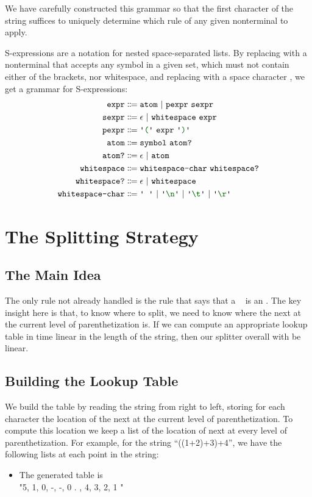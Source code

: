   We have carefully constructed this grammar so that the first character of the string suffices to uniquely determine which rule of any given nonterminal to apply.
  
  S-expressions are a notation for nested space-separated lists.  By replacing  with a nonterminal that accepts any symbol in a given set, which must not contain either of the brackets, nor whitespace, and replacing \terminal{+} with a space character \terminal{\ }, we get a grammar for S-expressions:
  \begin{align*}
    \nt{expr} & \Coloneqq \nt{atom}~|~\nt{pexpr}~\nt{sexpr} \\
    \nt{sexpr} & \Coloneqq \epsilon~|~\nt{whitespace}~\nt{expr} \\
    \nt{pexpr} & \Coloneqq \terminal{(}~\nt{expr}~\terminal{)} \\
    \nt{atom} & \Coloneqq \nt{symbol}~\nt{atom?} \\
    \nt{atom?} & \Coloneqq \epsilon~|~\nt{atom} \\
    \nt{whitespace} & \Coloneqq \nt{whitespace-char}~\nt{whitespace?} \\
    \nt{whitespace?} & \Coloneqq \epsilon~|~\nt{whitespace} \\
    \nt{whitespace-char} & \Coloneqq \terminal{\ }~|~\terminal{\textbackslash n}~|~\terminal{\textbackslash t}~|~\terminal{\textbackslash r}
  \end{align*}
  
\section{The Splitting Strategy}
  \subsection{The Main Idea}
    The only rule not already handled is the rule that says that a ~ is an .  The key insight here is that, to know where to split, we need to know where the next \terminal{+} at the current level of parenthetization is.  If we can compute an appropriate lookup table in time linear in the length of the string, then our splitter overall with be linear.
    
  \subsection{Building the Lookup Table}
    We build the table by reading the string from right to left, storing for each character the location of the next \terminal{+} at the current level of parenthetization.  To compute this location we keep a list of the location of next \terminal{+} at every level of parenthetization.  For example, for the string ``((1+2)+3)+4'', we have the following lists at each point in the string:
      \begin{itemize} \item  The generated table is  \\
          "5, 1, 0, -, -, 0 .
            , 4, 3, 2, 1
          "
    \end{itemize}
    
